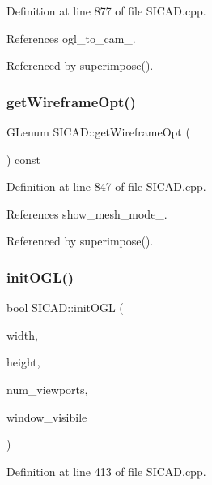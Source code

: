 Definition at line 877 of file S\+I\+C\+A\+D.\+cpp.



References ogl\+\_\+to\+\_\+cam\+\_\+.



Referenced by superimpose().

\mbox{\label{classSICAD_af65b5ad73e2c0e872face157b56bd68b}} 
\subsubsection{\texorpdfstring{get\+Wireframe\+Opt()}{getWireframeOpt()}}
{\footnotesize\ttfamily G\+Lenum S\+I\+C\+A\+D\+::get\+Wireframe\+Opt (\begin{DoxyParamCaption}{ }\end{DoxyParamCaption}) const}



Definition at line 847 of file S\+I\+C\+A\+D.\+cpp.



References show\+\_\+mesh\+\_\+mode\+\_\+.



Referenced by superimpose().

\mbox{\label{classSICAD_a102619690ab32e300405d22d52e36a5e}} 
\subsubsection{\texorpdfstring{init\+O\+G\+L()}{initOGL()}}
{\footnotesize\ttfamily bool S\+I\+C\+A\+D\+::init\+O\+GL (\begin{DoxyParamCaption}\item[{const G\+Lsizei}]{width,  }\item[{const G\+Lsizei}]{height,  }\item[{const G\+Lint}]{num\+\_\+viewports,  }\item[{const bool}]{window\+\_\+visibile }\end{DoxyParamCaption})\hspace{0.3cm}{\ttfamily [private]}}



Definition at line 413 of file S\+I\+C\+A\+D.\+cpp.



